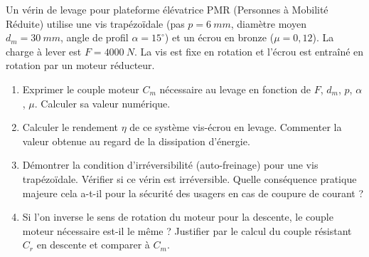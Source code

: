 \documentclass[11pt]{article}
\begin{document}
\begin{exercice}
Un vérin de levage pour plateforme élévatrice PMR (Personnes à Mobilité Réduite) utilise une vis trapézoïdale (pas $p = \SI{6}{mm}$, diamètre moyen $d_m = \SI{30}{mm}$, angle de profil $\alpha = 15^\circ$) et un écrou en bronze ($\mu = 0,12$). La charge à lever est $F = \SI{4000}{N}$. La vis est fixe en rotation et l'écrou est entraîné en rotation par un moteur réducteur.

\begin{enumerate}
    \item Exprimer le couple moteur $C_m$ nécessaire au levage en fonction de $F$, $d_m$, $p$, $\alpha$, $\mu$. Calculer sa valeur numérique.
    \item Calculer le rendement $\eta$ de ce système vis-écrou en levage. Commenter la valeur obtenue au regard de la dissipation d'énergie.
    \item Démontrer la condition d'irréversibilité (auto-freinage) pour une vis trapézoïdale. Vérifier si ce vérin est irréversible. Quelle conséquence pratique majeure cela a-t-il pour la sécurité des usagers en cas de coupure de courant ?
    \item Si l'on inverse le sens de rotation du moteur pour la descente, le couple moteur nécessaire est-il le même ? Justifier par le calcul du couple résistant $C_r$ en descente et comparer à $C_m$.
\end{enumerate}
\end{exercice}
\end{document}
